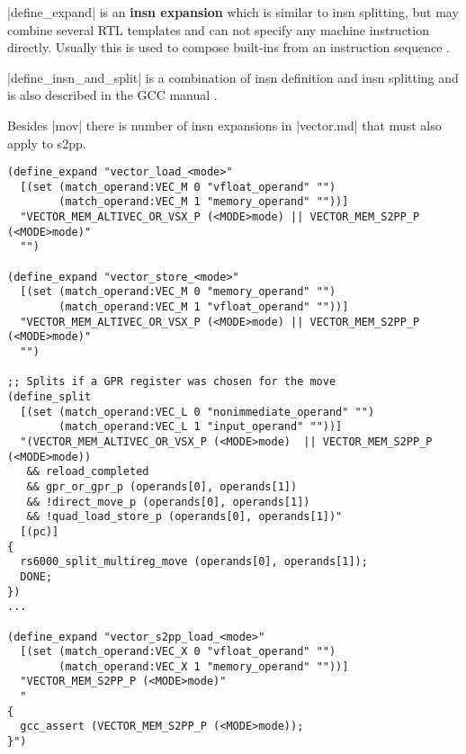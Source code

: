 |define_expand| is an \textbf{insn expansion} which is similar to insn splitting, but may combine several RTL templates and can not specify any machine instruction directly.
Usually this is used to compose built-ins from an instruction sequence \citep[ch.~16.15]{GCCint}.

|define_insn_and_split| is a combination of insn definition and insn splitting and is also described in the GCC manual \citep[ch.~16.16]{GCCint}.

Besides |mov| there is number of insn expansions in |vector.md| that must also apply to s2pp.
\begin{lstlisting}
(define_expand "vector_load_<mode>"
  [(set (match_operand:VEC_M 0 "vfloat_operand" "")
        (match_operand:VEC_M 1 "memory_operand" ""))]
  "VECTOR_MEM_ALTIVEC_OR_VSX_P (<MODE>mode) || VECTOR_MEM_S2PP_P (<MODE>mode)"
  "")

(define_expand "vector_store_<mode>"
  [(set (match_operand:VEC_M 0 "memory_operand" "")
        (match_operand:VEC_M 1 "vfloat_operand" ""))]
  "VECTOR_MEM_ALTIVEC_OR_VSX_P (<MODE>mode) || VECTOR_MEM_S2PP_P (<MODE>mode)"
  "")

;; Splits if a GPR register was chosen for the move
(define_split
  [(set (match_operand:VEC_L 0 "nonimmediate_operand" "")
        (match_operand:VEC_L 1 "input_operand" ""))]
  "(VECTOR_MEM_ALTIVEC_OR_VSX_P (<MODE>mode)  || VECTOR_MEM_S2PP_P (<MODE>mode))
   && reload_completed
   && gpr_or_gpr_p (operands[0], operands[1])
   && !direct_move_p (operands[0], operands[1])
   && !quad_load_store_p (operands[0], operands[1])"
  [(pc)]
{
  rs6000_split_multireg_move (operands[0], operands[1]);
  DONE;
})
...

(define_expand "vector_s2pp_load_<mode>"
  [(set (match_operand:VEC_X 0 "vfloat_operand" "")
        (match_operand:VEC_X 1 "memory_operand" ""))]
  "VECTOR_MEM_S2PP_P (<MODE>mode)"
  "
{
  gcc_assert (VECTOR_MEM_S2PP_P (<MODE>mode));
}")


\end{lstlisting}
